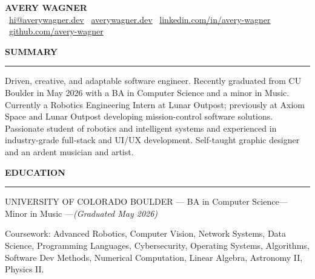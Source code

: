 \documentclass[10pt,letterpaper,ragged2e,withhyper]{altacv}
\newcommand{\headingfont}{\bfseries}
\renewcommand{\namefont}{\bfseries\fontsize{16}{18}\selectfont}
\newcommand{\education}[4]{
  \textcolor{subheading}{\MakeUppercase{#1}} \hspace{0.2cm}--- \hspace{0.2cm}#3\hspace{0.2cm}--- \hspace{0.2cm}#4 \hspace{0.2cm}—\hspace{0.2cm}\emph{(#2)}
  \vspace{4pt}  %
}
\begin{document}
\renewcommand{\cvsection}[1]{%
  \vspace{0.8em}
  {\headingfont\bfseries\color{heading}\MakeUppercase{#1}}\\[-2pt]
  {\color{accent}\rule{\linewidth}{0.4pt}}%
  \vspace{0.4em}
}


\begin{center}
  {\namefont\color{name}\MakeUppercase{Avery Wagner}}\\[4pt]

  {\small
    \faEnvelope\ \href{mailto:hi@averywagner.dev}{hi@averywagner.dev} \quad\textbullet\quad
    \faGlobe\ \href{https://averywagner.dev}{averywagner.dev} \quad\textbullet\quad
    \faLinkedin\ \href{https://linkedin.com/in/avery-wagner}{linkedin.com/in/avery-wagner} \quad\textbullet\quad
    \faGithub\ \href{https://github.com/avery-wagner}{github.com/avery-wagner}
  }
\end{center}



\cvsection{SUMMARY}
Driven, creative, and adaptable software engineer. Recently graduated from CU Boulder in May 2026 with a BA in Computer Science and a minor in Music. Currently a Robotics Engineering Intern at Lunar Outpost; previously at Axiom Space and Lunar Outpost developing mission-control software solutions. Passionate student of robotics and intelligent systems and experienced in industry-grade full-stack and UI/UX development. Self-taught graphic designer and an ardent musician and artist.

\cvsection{EDUCATION}
\education
  {University of Colorado Boulder}
  {Graduated May 2026}
  {BA in Computer Science}
  {Minor in Music}

Coursework: Advanced Robotics, Computer Vision, Network Systems, Data Science, Programming Languages, Cybersecurity, Operating Systems, Algorithms, Software Dev Methods, Numerical Computation, Linear Algebra, Astronomy II, Physics II.

\vspace{0.3em}
\end{document}
